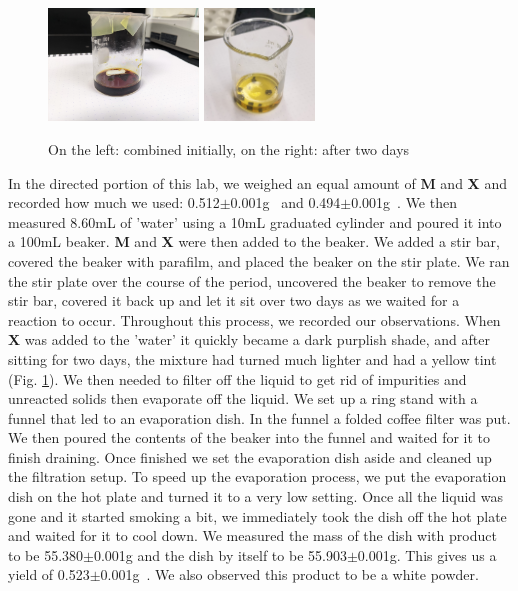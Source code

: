 \documentclass[titlepage]{article}
\begin{document}
\begin{figure}[h]
    \centering
    \includegraphics[height=3cm]{MX_initial.png}
    \includegraphics[height=3cm]{MX_final.png}
    \caption{On the left:  combined initially, on the right:  after two days}
    \label{fig:mx_comparison}
\end{figure}

In the directed portion of this lab, we weighed an equal amount of \textbf{M} and \textbf{X} and recorded how much we used: 0.512$\pm$0.001\unit{\gram{}} and 0.494$\pm$0.001\unit{\gram{}}. We then measured 8.60\unit{\milli\liter} of 'water' using a 10\unit{\milli\liter} graduated cylinder and poured it into a 100\unit{\milli\liter} beaker. \textbf{M} and \textbf{X} were then added to the beaker. We added a stir bar, covered the beaker with parafilm, and placed the beaker on the stir plate. We ran the stir plate over the course of the period, uncovered the beaker to remove the stir bar, covered it back up and let it sit over two days as we waited for a reaction to occur. Throughout this process, we recorded our observations. When \textbf{X} was added to the 'water' it quickly became a dark purplish shade, and after sitting for two days, the mixture had turned much lighter and had a yellow tint (Fig. \ref{fig:mx_comparison}). We then needed to filter off the liquid to get rid of impurities and unreacted solids then evaporate off the liquid. We set up a ring stand with a funnel that led to an evaporation dish. In the funnel a folded coffee filter was put. We then poured the contents of the beaker into the funnel and waited for it to finish draining. Once finished we set the evaporation dish aside and cleaned up the filtration setup. To speed up the evaporation process, we put the evaporation dish on the hot plate and turned it to a very low setting. Once all the liquid was gone and it started smoking a bit, we immediately took the dish off the hot plate and waited for it to cool down. We measured the mass of the dish with product to be 55.380$\pm$0.001\unit{\gram} and the dish by itself to be 55.903$\pm$0.001\unit{\gram}. This gives us a yield of 0.523$\pm$0.001\unit{\gram{}}. We also observed this product to be a white powder.
\end{document}
